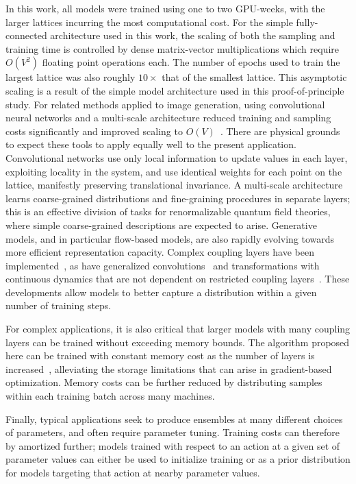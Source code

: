 In this work, all models were trained using one to two GPU-weeks, with the larger lattices incurring the most computational cost.
For the simple fully-connected architecture used in this work, the scaling of both the sampling and training time is controlled by dense matrix-vector multiplications which require $O(V^2)$ floating point operations each. The number of epochs used to train the largest lattice was also roughly $10\times$ that of the smallest lattice. This asymptotic scaling is a result of the simple model architecture used in this proof-of-principle study. For related methods applied  to image generation, using convolutional neural networks and a multi-scale architecture reduced training and sampling costs significantly and improved scaling to $O(V)$~\cite{Dinh2016}. There are physical grounds to expect these tools to apply equally well to the present application. Convolutional networks use only local information to update values in each layer, exploiting locality in the system, and use identical weights for each point on the lattice, manifestly preserving translational invariance. A multi-scale architecture learns coarse-grained distributions and fine-graining procedures in separate layers; this is an effective division of tasks for renormalizable quantum field theories, where simple coarse-grained descriptions are expected to arise. Generative models, and in particular flow-based models, are also rapidly evolving towards more efficient representation capacity. Complex coupling layers have been implemented~\cite{Dinh2015, Dinh2016}, as have generalized convolutions~\cite{Kingma2018, Hoogeboom2019} and transformations with continuous dynamics that are not dependent on restricted coupling layers~\cite{Grathwohl2019}. These developments allow models to better capture a distribution within a given number of training steps.
%
%

For complex applications, it is also critical that larger models with many coupling layers can be trained without exceeding memory bounds. The algorithm proposed here can be trained with constant memory cost as the number of layers is increased~\cite{Grathwohl2018}, alleviating the storage limitations that can arise in gradient-based optimization. Memory costs can be further reduced by distributing samples within each training batch across many machines.


Finally, typical applications seek to produce ensembles at many different choices of parameters, and often require parameter tuning. Training costs can therefore by amortized further; models trained with respect to an action at a given set of parameter values can either be used to initialize training or as a prior distribution for models targeting that action at nearby parameter values.
